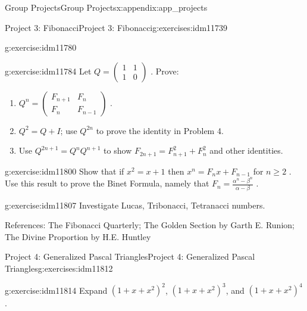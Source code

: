 \documentclass[oneside,10pt,]{book}
\numberwithin{equation}{chapter}
\newcommand{\amp}{&}
\begin{document}
\begin{appendixptx}{Group Projects}{}{Group Projects}{}{}{x:appendix:app_projects}
\begin{exercises-section-numberless}{Project 3: Fibonacci}{}{Project 3: Fibonacci}{}{}{g:exercises:idm11739}
\begin{divisionexercise}{6}{}{}{g:exercise:idm11780}
\begin{equation*}
\end{equation*}
%
\end{divisionexercise}%
\begin{divisionexercise}{7}{}{}{g:exercise:idm11784}%
Let \(Q =\begin{pmatrix}1 \amp 1 \\ 1 \amp 0\end{pmatrix}\) . Prove:%
\begin{enumerate}[label=(\alph*)]
\item{}\(Q^{n} = \begin{pmatrix} F_{n + 1} \amp F_{n}\\ F_{n} \amp F_{n - 1} \end{pmatrix}\) .%
\item{}\(Q^{2} = Q + I\); use \(Q^{2n}\) to prove the identity in Problem 4.%
\item{}Use \(Q^{2n + 1} = Q^{n}Q^{n + 1}\) to show \(F_{2n + 1} = F_{n + 1}^{2} + F_{n}^{2}\) and other identities.%
\end{enumerate}
%
\end{divisionexercise}%
\begin{divisionexercise}{8}{}{}{g:exercise:idm11800}%
Show that if \(x^{2} = x + 1\) then \(x^{n} = F_{n}x + F_{n - 1}\) for \(n \geq 2\) . Use this result to prove the Binet Formula, namely that \(F_{n} = \frac{\alpha^{n} - \beta^{n}}{\alpha - \beta}\) .%
\end{divisionexercise}%
\begin{divisionexercise}{9}{}{}{g:exercise:idm11807}%
Investigate Lucas, Tribonacci, Tetranacci numbers.%
\end{divisionexercise}%
\begin{conclusion}{}%
References: The Fibonacci Quarterly; The Golden Section by Garth E. Runion; The Divine Proportion by H.E. Huntley%
\end{conclusion}%
\end{exercises-section-numberless}
%
%
\typeout{************************************************}
\typeout{************************************************}
%
\begin{exercises-section-numberless}{Project 4: Generalized Pascal Triangles}{}{Project 4: Generalized Pascal Triangles}{}{}{g:exercises:idm11812}
\begin{divisionexercise}{1}{}{}{g:exercise:idm11814}%
Expand \({\left( 1 + x + x^{2} \right)}^{2}\), \(\left( 1 + x + x^{2} \right)^{3}\), and \(\left( 1 + x + x^{2} \right)^{4}\).%

\end{divisionexercise}
\end{exercises-section-numberless}
\end{appendixptx}
\end{document}
